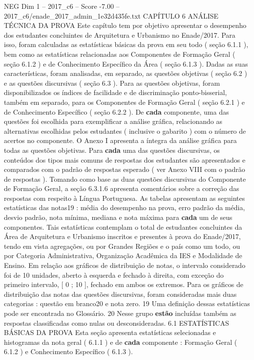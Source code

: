 \begin{textsample}{NEG Dim 1 – 2017\_c6 – Score -7.00 – 2017\_c6/enade\_2017\_admin\_1e32d435fe.txt}  \label{ex:f1_neg_141}
CAPÍTULO 6 ANÁLISE TÉCNICA DA PROVA Este capítulo tem por objetivo apresentar o desempenho dos estudantes concluintes de Arquitetura e Urbanismo no Enade/2017.
Para isso, foram calculadas as estatísticas básicas da prova em seu todo ( seção 6.1.1 ), bem como as estatísticas relacionadas aos Componentes de Formação Geral ( seção 6.1.2 ) e de Conhecimento Específico da Área ( seção 6.1.3 ).
Dadas as suas características, foram analisadas, em separado, as questões objetivas ( seção 6.2 ) e as questões discursivas ( seção 6.3 ).
Para as questões objetivas, foram disponibilizados os índices de facilidade e de discriminação ponto-bisserial, também em separado, para os Componentes de Formação Geral ( seção 6.2.1 ) e de Conhecimento Específico ( seção 6.2.2 ).
De \textbf{cada} componente, uma das questões foi escolhida para exemplificar a análise gráfica, relacionando as alternativas escolhidas pelos estudantes ( inclusive o gabarito ) com o número de acertos no componente.
O Anexo I apresenta a íntegra da análise gráfica para todas as questões objetivas.
Para \textbf{cada} uma das questões discursivas, os conteúdos dos tipos mais comuns de respostas dos estudantes são apresentados e comparados com o padrão de respostas esperado ( ver Anexo VIII com o padrão de respostas ).
Tomando como base as duas questões discursivas do Componente de Formação Geral, a seção 6.3.1.6 apresenta comentários sobre a correção das respostas com respeito à Língua Portuguesa.
As tabelas apresentam as seguintes estatísticas das notas19 : média do desempenho na prova, erro padrão da média, desvio padrão, nota mínima, mediana e nota máxima para \textbf{cada} um de seus componentes.
Tais estatísticas contemplam o total de estudantes concluintes da Área de Arquitetura e Urbanismo inscritos e presentes à prova do Enade/2017, tendo em vista agregações, ou por Grandes Regiões e o país como um todo, ou por Categoria Administrativa, Organização Acadêmica da IES e Modalidade de Ensino.
Em relação aos gráficos de distribuição de notas, o intervalo considerado foi de 10 unidades, aberto à esquerda e fechado à direita, com exceção do primeiro intervalo, [ 0 ; 10 ], fechado em ambos os extremos.
Para os gráficos de distribuição das notas das questões discursivas, foram consideradas mais duas categorias : questão em branco20 e nota zero. 19 Uma definição dessas estatísticas pode ser encontrada no Glossário. 20 Nesse grupo \textbf{estão} incluídas também as respostas classificadas como nulas ou desconsideradas. 6.1 ESTATÍSTICAS BÁSICAS DA PROVA Esta seção apresenta estatísticas selecionadas e histogramas da nota geral ( 6.1.1 ) e de \textbf{cada} componente : Formação Geral ( 6.1.2 ) e Conhecimento Específico ( 6.1.3 ).

\end{textsample}
